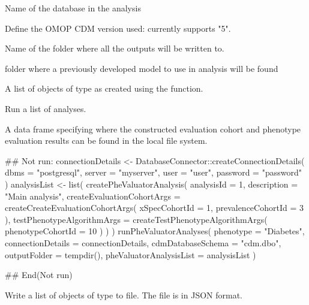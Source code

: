 \documentclass[a4paper]{book}
\begin{document}
\begin{Arguments}
\begin{ldescription}
\item[\code{databaseId}] Name of the database in the analysis

\item[\code{cdmVersion}] Define the OMOP CDM version used: currently supports "5".

\item[\code{outputFolder}] Name of the folder where all the outputs will be written to.

\item[\code{priorModelToUse}] folder where a previously developed model to use in analysis will be found

\item[\code{pheValuatorAnalysisList}] A list of objects of type  as created using
the  function.
\end{ldescription}
\end{Arguments}
%
\begin{Details}
Run a list of analyses.
\end{Details}
%
\begin{Value}
A data frame specifying where the constructed evaluation cohort and phenotype evaluation results can be found
in the local file system.
\end{Value}
%
\begin{Examples}
\begin{ExampleCode}
## Not run: 
connectionDetails <- DatabaseConnector::createConnectionDetails(
  dbms = "postgresql",
  server = "myserver",
  user = "user",
  password = "password"
)
analysisList <- list(
  createPheValuatorAnalysis(
    analysisId = 1,
    description = "Main analysis",
    createEvaluationCohortArgs = createCreateEvaluationCohortArgs(
      xSpecCohortId = 1,
      prevalenceCohortId = 3
    ),
    testPhenotypeAlgorithmArgs = createTestPhenotypeAlgorithmArgs(
      phenotypeCohortId = 10
    )
  )
)
runPheValuatorAnalyses(
  phenotype = "Diabetes",
  connectionDetails = connectionDetails,
  cdmDatabaseSchema = "cdm.dbo",
  outputFolder = tempdir(),
  pheValuatorAnalysisList = analysisList
)

## End(Not run)

\end{ExampleCode}
\end{Examples}
%
\begin{Description}
Write a list of objects of type  to file. The file is in JSON format.
\end{Description}
\end{document}

